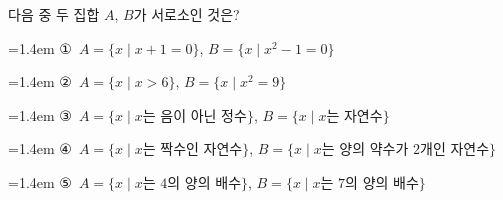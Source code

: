 다음 중 두 집합 $A$, $B$가 서로소인 것은?
\par\medskip\par\noindent\hangindent=1.4em {\small ①}\ $A=\{x \mid x+1=0\}$, $B=\{x \mid x^2-1=0\}$\par\noindent\hangindent=1.4em {\small ②}\ $A=\{x \mid x>6\}$, $B=\{x \mid x^2=9\}$\par\noindent\hangindent=1.4em {\small ③}\ $A=\{x \mid x$는 음이 아닌 정수$\}$, $B=\{x \mid x$는 자연수$\}$\par\noindent\hangindent=1.4em {\small ④}\ $A=\{x \mid x$는 짝수인 자연수$\}$, $B=\{x \mid x$는 양의 약수가 $2$개인 자연수$\}$\par\noindent\hangindent=1.4em {\small ⑤}\ $A=\{x \mid x$는 $4$의 양의 배수$\}$, $B=\{x \mid x$는 $7$의 양의 배수$\}$\par\medskip
